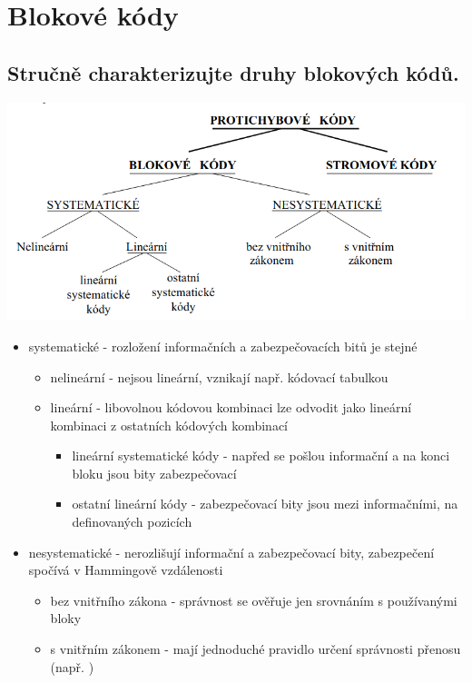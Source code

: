 \clearpage
\section{Blokové kódy}
\subsection{Stručně charakterizujte druhy blokových kódů.} \label{druhy}
\includegraphics[width=16cm]{images/6_druhy.png}
\begin{itemize}
    \item systematické - rozložení informačních a zabezpečovacích bitů je stejné
    \begin{itemize}
        \item nelineární - nejsou lineární, vznikají např. kódovací tabulkou
        \item lineární - libovolnou kódovou kombinaci lze odvodit jako lineární kombinaci z ostatních kódových kombinací
        \begin{itemize}
            \item lineární systematické kódy - napřed se pošlou informační a na konci bloku jsou bity zabezpečovací
            \item ostatní lineární kódy - zabezpečovací bity jsou mezi informačními, na definovaných pozicích
        \end{itemize}
    \end{itemize}
    \item nesystematické - nerozlišují informační a zabezpečovací bity, zabezpečení spočívá v Hammingově vzdálenosti
    \begin{itemize}
        \item bez vnitřního zákona - správnost se ověřuje jen srovnáním s používanými bloky
        \item s vnitřním zákonem - mají jednoduché pravidlo určení správnosti přenosu (např. )
    \end{itemize}
\end{itemize}

